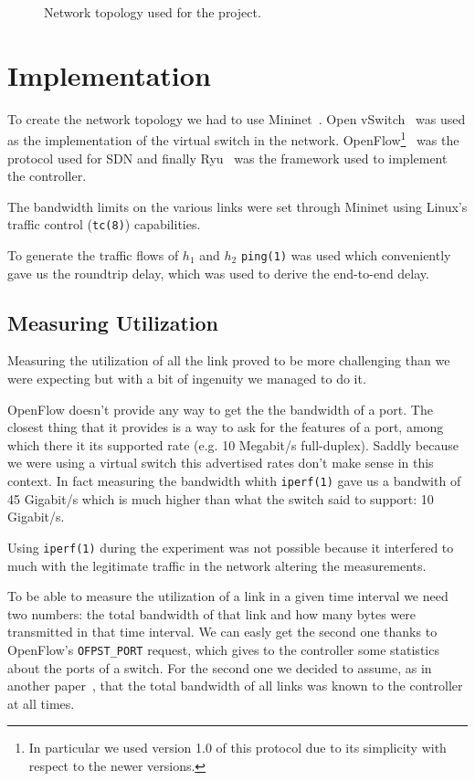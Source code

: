 \documentclass[twocolumn]{article}
\begin{document}
\begin{figure}
\centering
{}
\caption{Network topology used for the project.}
\label{fig:topo}
\end{figure}

\section{Implementation}
To create the network topology we had to use Mininet~\cite{mininet}. Open
vSwitch~\cite{openvswitch} was used as the implementation of the virtual switch
in the network. OpenFlow\footnote{In particular we used version 1.0 of this
protocol due to its simplicity with respect to the newer
versions.}~\cite{openflow} was the protocol used for SDN and finally
Ryu~\cite{ryu} was the framework used to implement the controller.

The bandwidth limits on the various links were set through Mininet using Linux's
traffic control (\texttt{tc(8)}) capabilities.

To generate the traffic flows of $h_1$ and $h_2$ \texttt{ping(1)} was
used which conveniently gave us the roundtrip delay, which was used to derive
the end-to-end delay.

\subsection{Measuring Utilization}
Measuring the utilization of all the link proved to be more challenging than we
were expecting but with a bit of ingenuity we managed to do it.

OpenFlow doesn't provide any way to get the the bandwidth of a port. The closest
thing that it provides is a way to ask for the features of a port, among which
there it its supported rate (e.g. 10 Megabit/s full-duplex). Saddly because we
were using a virtual switch this advertised rates don't make sense in this
context. In fact measuring the bandwidth whith \texttt{iperf(1)} gave us a
bandwith of 45 Gigabit/s which is much higher than what the switch said to
support: 10 Gigabit/s.

Using \texttt{iperf(1)} during the experiment was not possible because it
interfered to much with the legitimate traffic in the network altering the
measurements.

To be able to measure the utilization of a link in a given time interval we need
two numbers: the total bandwidth of that link and how many bytes were
transmitted in that time interval. We can easly get the second one thanks to
OpenFlow's \texttt{OFPST\_PORT} request, which gives to the controller some
statistics about the ports of a switch. For the second one we decided to assume,
as in another paper~\cite{sdn-bandwidth}, that the total bandwidth of all links
was known to the controller at all times.
\end{document}

